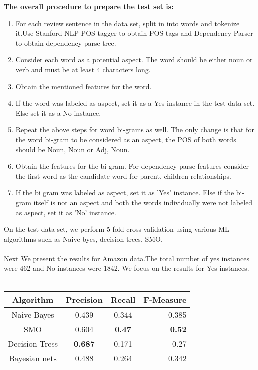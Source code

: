 \documentclass[12pt]{article}
\begin{document}
\textbf{The overall procedure to prepare the test set is:}
\begin{enumerate}
\item For each review sentence in the data set, split in into words and tokenize it.Use Stanford NLP POS tagger to obtain POS tags and Dependency Parser to obtain dependency parse tree.
\item Consider each word  as a potential aspect. The word should be either noun or verb and must be at least 4 characters long.
\item Obtain the mentioned features for the word.
\item If the word was labeled as aspect, set it as a Yes instance in the test data set. Else 
set it as a No instance.
\item Repeat the above steps for word bi-grams as well. The only change is that for the word bi-gram to be considered as an aspect, the POS of both words should be Noun, Noun or Adj, Noun.
\item Obtain the features for the bi-gram. For dependency parse features consider the first word as the candidate word for parent, children relationships.
\item If the bi gram was labeled as aspect, set it as 'Yes' instance. Else if the bi-gram itself is not an aspect and both the words individually were not labeled as aspect, set it as 'No' instance.

\end{enumerate}
\noindent
On the test data set, we perform 5 fold cross validation using various ML algorithms such as Naive byes, decision trees, SMO.\\\\
\noindent
Next We present the results for Amazon data.The total number of yes instances were 462 and No instances were 1842. We focus on the results for Yes instances.\\\\
\begin{tabular}{ | c || c | c | r |  }
\hline			
  Algorithm  & Precision & Recall & F-Measure \\ \hline
  Naive Bayes & 0.439 & 0.344 & 0.385 \\ \hline
  SMO & 0.604 & \textbf{0.47} & \textbf{0.52} \\ \hline
  Decision Tress & \textbf{0.687} & 0.171 & 0.27 \\ \hline
  Bayesian nets  & 0.488 & 0.264 & 0.342  \\ \hline
\end{tabular} \\\\
\end{document}
